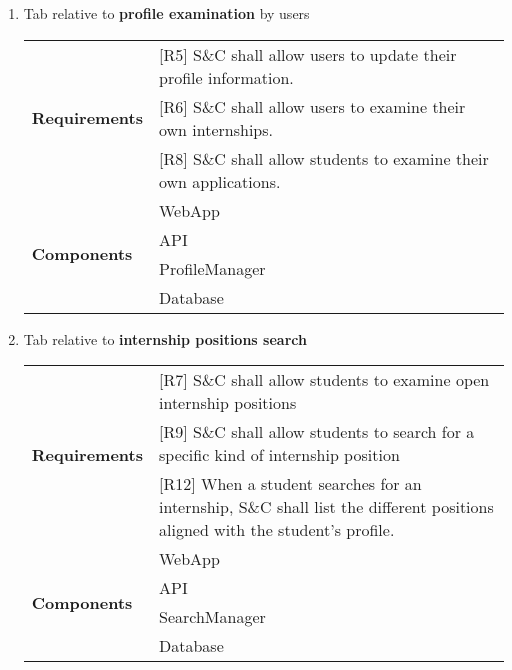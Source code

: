 \begin{enumerate}
    \item Tab relative to \textbf{profile examination} by users
    \begin{center}
        \begin{tabular}{  |p{4cm}|p{10cm}| } 
        \hline
        \multirow{3}{6em}{\textbf{Requirements}} 
        & [R5] S\&C shall allow users to update their profile information. \\                 
        & [R6] S\&C shall allow users to examine their own internships. \\
        & [R8] S\&C shall allow students to examine their own applications. \\
        \hline
        \multirow{4}{6em}{\textbf{Components}} 
        & WebApp \\ 
        & API \\ 
        & ProfileManager \\ 
        & Database \\
        \hline
        \end{tabular}
    \end{center}
    
    \item Tab relative to \textbf{internship positions search}
    \begin{center}
        \begin{tabular}{ |p{4cm}|p{10cm}| } 
        \hline
        \multirow{3}{6em}{\textbf{Requirements}} 
        & [R7] S\&C shall allow students to examine open internship positions \\
        & [R9] S\&C shall allow students to search for a specific kind of internship position \\
        & [R12] When a student searches for an internship, S\&C shall list the different positions aligned with the
        student’s profile. \\
        \hline
        \multirow{4}{6em}{\textbf{Components}} 
        & WebApp \\ 
        & API \\ 
        & SearchManager \\ 
        & Database \\
        \hline
        \end{tabular}
    \end{center}


\end{enumerate}
